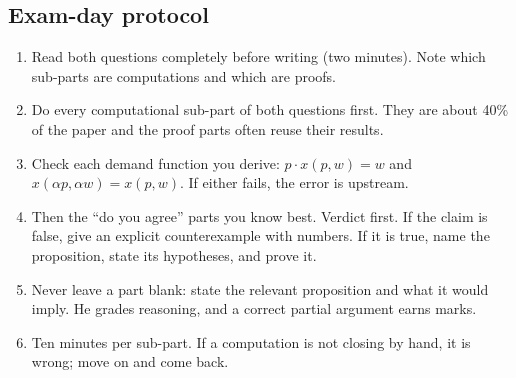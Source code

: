 \documentclass[11pt]{article}
\begin{document}
\subsection{Exam-day protocol}
\begin{enumerate}
\item Read both questions completely before writing (two minutes). Note which sub-parts are computations and which are proofs.
\item Do every computational sub-part of both questions first. They are about 40\% of the paper and the proof parts often reuse their results.
\item Check each demand function you derive: $p\cdot x(p,w)=w$ and $x(\alpha p,\alpha w)=x(p,w)$. If either fails, the error is upstream.
\item Then the ``do you agree'' parts you know best. Verdict first. If the claim is false, give an explicit counterexample with numbers. If it is true, name the proposition, state its hypotheses, and prove it.
\item Never leave a part blank: state the relevant proposition and what it would imply. He grades reasoning, and a correct partial argument earns marks.
\item Ten minutes per sub-part. If a computation is not closing by hand, it is wrong; move on and come back.
\end{enumerate}
\end{document}
